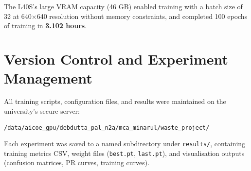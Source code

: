 The L40S's large VRAM capacity (46 GB) enabled training with a batch size of 32 at 640$\times$640 resolution without memory constraints, and completed 100 epochs of training in \textbf{3.102 hours}.

\section{Version Control and Experiment Management}

All training scripts, configuration files, and results were maintained on the university's secure server:
\begin{center}
\texttt{/data/aicoe\_gpu/debdutta\_pal\_n2a/mca\_minarul/waste\_project/}
\end{center}

Each experiment was saved to a named subdirectory under \texttt{results/}, containing training metrics CSV, weight files (\texttt{best.pt}, \texttt{last.pt}), and visualisation outputs (confusion matrices, PR curves, training curves).
